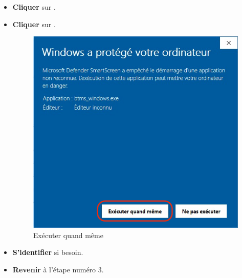 \documentclass[a4paper,12pt]{article}
\begin{document}
        \begin{itemize}
            \item
                \textbf{Cliquer} sur .
            \clearpage
            \item
                \textbf{Cliquer} sur .
                \begin{figure}[h]
                    \centering
                    \includegraphics[scale=0.7]{exec_qdmm.png}
                    \caption{Exécuter quand même}
                \end{figure}
            \item
                \textbf{S'identifier} si besoin.
            \item
                \textbf{Revenir} à l'étape numéro 3.
        \end{itemize}


    \clearpage
\end{document}
